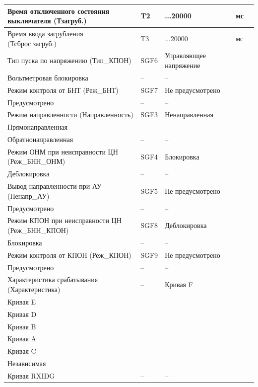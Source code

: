 \begin{longtable}{|>{\centering\arraybackslash}m{5.3cm}|>{\centering\arraybackslash}m{3.3cm}|>{\centering\arraybackslash}m{4.2cm}|>{\centering\arraybackslash}m{1.8cm}|>{\centering\arraybackslash}m{1cm}|}
\hline
\centering Время отключенного состояния выключателя (Тзагруб.)  & \centering T2 & \centering 0...20000 & \centering мс & \centering \arraybackslash 10 \\
\hline
\centering Время ввода загрубления (Тсброс.загруб.)  & \centering T3 & \centering 0...20000 & \centering мс & \centering \arraybackslash 10 \\
\hline
\centering Тип пуска по напряжению (Тип\_КПОН)  & \centering SGF6 & \centering Управляющее напряжение \\ Вольтметровая блокировка & \centering -- & \centering \arraybackslash -- \\
\hline
\centering Режим контроля от БНТ (Реж\_БНТ)  & \centering SGF7 & \centering Не предусмотрено \\ Предусмотрено & \centering -- & \centering \arraybackslash -- \\
\hline
\centering Режим направленности (Направленность)  & \centering SGF3 & \centering Ненаправленная \\ Прямонаправленная \\ Обратнонаправленная & \centering -- & \centering \arraybackslash -- \\
\hline
\centering Режим ОНМ при неисправности ЦН (Реж\_БНН\_ОНМ)  & \centering SGF4 & \centering Блокировка \\ Деблокировка & \centering -- & \centering \arraybackslash -- \\
\hline
\centering Вывод направленности при АУ (Ненапр\_АУ)  & \centering SGF5 & \centering Не предусмотрено \\ Предусмотрено & \centering -- & \centering \arraybackslash -- \\
\hline
\centering Режим КПОН при неисправности ЦН (Реж\_БНН\_КПОН)  & \centering SGF8 & \centering Деблокировка \\ Блокировка & \centering -- & \centering \arraybackslash -- \\
\hline
\centering Режим контроля от КПОН (Реж\_КПОН)  & \centering SGF9 & \centering Не предусмотрено \\ Предусмотрено & \centering -- & \centering \arraybackslash -- \\
\hline
\centering Характеристика срабатывания (Характеристика)  & \centering -- & \centering Кривая F \\ Кривая E \\ Кривая D \\ Кривая B \\ Кривая A \\ Кривая C \\ Независимая \\ Кривая RXIDG & \centering -- & \centering \arraybackslash -- \\

\end{longtable}
